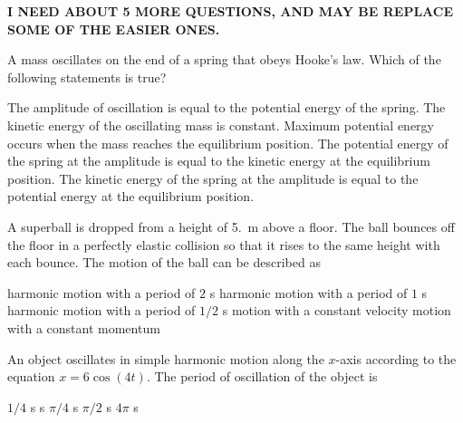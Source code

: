 \documentclass{../../../oss-classkick-exam}
\begin{document}
\genheader


\genmultidirections

\gengravity

\textbf{I NEED ABOUT 5 MORE QUESTIONS, AND MAY BE REPLACE SOME OF THE EASIER
  ONES.}

\raggedcolumns
\begin{multicols*}{2}
  \begin{questions}
    \question A mass oscillates on the end of a spring that obeys Hooke's law.
    Which of the following statements is true?
    \begin{choices}
      \choice The amplitude of oscillation is equal to the potential energy of
      the spring.
      \choice The kinetic energy of the oscillating mass is constant.
      \choice Maximum potential energy occurs when the mass reaches the
      equilibrium position.
      \choice The potential energy of the spring at the amplitude is equal to
      the kinetic energy at the equilibrium position.
      \choice The kinetic energy of the spring at the amplitude is equal to the
      potential energy at the equilibrium position.
    \end{choices}
    \vspace{.7in}
    
    \question A superball is dropped from a height of \SI{5.}{\metre} above a
    floor. The ball bounces off the floor in a perfectly elastic collision so
    that it rises to the same height with each bounce. The motion of the ball
    can be described as
    \begin{choices}
      \choice harmonic motion with a period of $2$ \si{\second}
      \choice harmonic motion with a period of $1$ \si{\second}
      \choice harmonic motion with a period of $1/2$ \si{\second}
      \choice motion with a constant velocity
      \choice motion with a constant momentum
    \end{choices}
    \vspace{.7in}
    
    \question An object oscillates in simple harmonic motion along the $x$-axis
    according to the equation $x=6\cos(4t)$. The period of oscillation of the
    object is
    \begin{choices}
      \choice $1/4$ s
       s
      \choice $\pi/4$ s
      \choice $\pi/2$ s
      \choice $4\pi$ s
    \end{choices}
    

\end{questions}
\end{multicols*}
\end{document}
